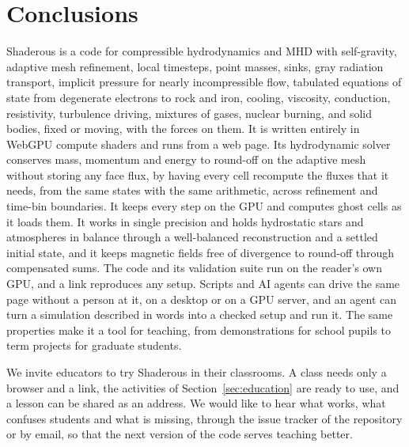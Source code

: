\documentclass[twocolumn]{aastex701}
\begin{document}
\section{Conclusions}
\label{sec:conclusions}

Shaderous is a code for compressible hydrodynamics and MHD with self-gravity, adaptive mesh refinement, local timesteps, point masses, sinks, gray radiation transport, implicit pressure for nearly incompressible flow, tabulated equations of state from degenerate electrons to rock and iron, cooling, viscosity, conduction, resistivity, turbulence driving, mixtures of gases, nuclear burning, and solid bodies, fixed or moving, with the forces on them. It is written entirely in WebGPU compute shaders and runs from a web page. Its hydrodynamic solver conserves mass, momentum and energy to round-off on the adaptive mesh without storing any face flux, by having every cell recompute the fluxes that it needs, from the same states with the same arithmetic, across refinement and time-bin boundaries. It keeps every step on the GPU and computes ghost cells as it loads them. It works in single precision and holds hydrostatic stars and atmospheres in balance through a well-balanced reconstruction and a settled initial state, and it keeps magnetic fields free of divergence to round-off through compensated sums. The code and its validation suite run on the reader's own GPU, and a link reproduces any setup. Scripts and AI agents can drive the same page without a person at it, on a desktop or on a GPU server, and an agent can turn a simulation described in words into a checked setup and run it. The same properties make it a tool for teaching, from demonstrations for school pupils to term projects for graduate students.

We invite educators to try Shaderous in their classrooms. A class needs only a browser and a link, the activities of Section~\ref{sec:education} are ready to use, and a lesson can be shared as an address. We would like to hear what works, what confuses students and what is missing, through the issue tracker of the repository or by email, so that the next version of the code serves teaching better.
\end{document}
